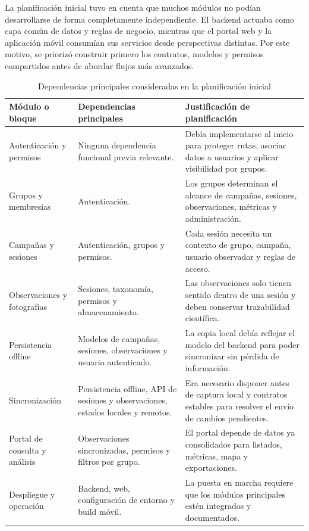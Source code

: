 La planificación inicial tuvo en cuenta que muchos módulos no podían desarrollarse
de forma completamente independiente. El backend actuaba como capa común de datos y
reglas de negocio, mientras que el portal web y la aplicación móvil consumían sus
servicios desde perspectivas distintas. Por este motivo, se priorizó construir
primero los contratos, modelos y permisos compartidos antes de abordar flujos más
avanzados.

\begin{table}[H]
\centering
\caption{Dependencias principales consideradas en la planificación inicial}
\label{tab:dependencias_planificacion_inicial}
\small
\renewcommand{\arraystretch}{1.18}
\begin{tabularx}{\textwidth}{p{3.2cm}X X}
\toprule
\textbf{Módulo o bloque} & \textbf{Dependencias principales} & \textbf{Justificación de planificación} \\
\midrule
Autenticación y permisos & Ninguna dependencia funcional previa relevante. & Debía implementarse al inicio para proteger rutas, asociar datos a usuarios y aplicar visibilidad por grupos. \\
Grupos y membresías & Autenticación. & Los grupos determinan el alcance de campañas, sesiones, observaciones, métricas y administración. \\
Campañas y sesiones & Autenticación, grupos y permisos. & Cada sesión necesita un contexto de grupo, campaña, usuario observador y reglas de acceso. \\
Observaciones y fotografías & Sesiones, taxonomía, permisos y almacenamiento. & Las observaciones solo tienen sentido dentro de una sesión y deben conservar trazabilidad científica. \\
Persistencia offline & Modelos de campañas, sesiones, observaciones y usuario autenticado. & La copia local debía reflejar el modelo del backend para poder sincronizar sin pérdida de información. \\
Sincronización & Persistencia offline, API de sesiones y observaciones, estados locales y remotos. & Era necesario disponer antes de captura local y contratos estables para resolver el envío de cambios pendientes. \\
Portal de consulta y análisis & Observaciones sincronizadas, permisos y filtros por grupo. & El portal depende de datos ya consolidados para listados, métricas, mapa y exportaciones. \\
Despliegue y operación & Backend, web, configuración de entorno y build móvil. & La puesta en marcha requiere que los módulos principales estén integrados y documentados. \\
\bottomrule
\end{tabularx}
\end{table}

